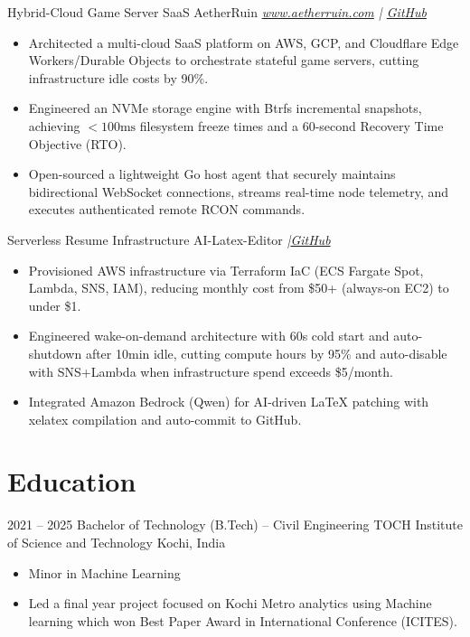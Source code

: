 \documentclass[10pt, a4paper, sans]{moderncv}
\begin{document}
\cventry
  {}
  {Hybrid-Cloud Game Server SaaS}
  {AetherRuin}
  {\textit{
    \href{https://www.aetherruin.com}{www.aetherruin.com}
    \quad|\quad
    \href{https://github.com/Vishhh03/AetherRuin-agent}{GitHub}
  }}
  {}
  {
  \begin{itemize}\setlength{\itemsep}{2pt}
    \item Architected a multi-cloud SaaS platform on AWS, GCP, and Cloudflare Edge Workers/Durable Objects to orchestrate stateful game servers, cutting infrastructure idle costs by 90\%.
    \item Engineered an NVMe storage engine with Btrfs incremental snapshots, achieving $<100\text{ms}$ filesystem freeze times and a 60-second Recovery Time Objective (RTO).
    \item Open-sourced a lightweight Go host agent that securely maintains bidirectional WebSocket connections, streams real-time node telemetry, and executes authenticated remote RCON commands.
  \end{itemize}
  }

\vspace{1mm}

\cventry
  {}
  {Serverless Resume Infrastructure}
  {AI-Latex-Editor}
  {\textit{\quad|\quad \href{https://github.com/Vishhh03/Latex-Resume}{GitHub}}}
  {}
  {
  \begin{itemize}\setlength{\itemsep}{2pt}
    \item Provisioned AWS infrastructure via Terraform IaC (ECS Fargate Spot, Lambda, SNS, IAM), reducing monthly cost from \$50+ (always-on EC2) to under \$1.
    \item Engineered wake-on-demand architecture with 60s cold start and auto-shutdown after 10min idle, cutting compute hours by 95\% and auto-disable with SNS+Lambda when infrastructure spend exceeds \$5/month.
    \item Integrated Amazon Bedrock (Qwen) for AI-driven LaTeX patching with xelatex compilation and auto-commit to GitHub.
  \end{itemize}
  }

\section{Education}

\cventry
  {2021 -- 2025}
  {Bachelor of Technology (B.Tech) -- Civil Engineering}
  {TOCH Institute of Science and Technology}
  {Kochi, India}
  {}
  {
  \begin{itemize}\setlength{\itemsep}{2pt}
    \item Minor in Machine Learning
    \item Led a final year project focused on Kochi Metro analytics using Machine learning which won Best Paper Award in International Conference (ICITES).
  \end{itemize}
  }
\end{document}
